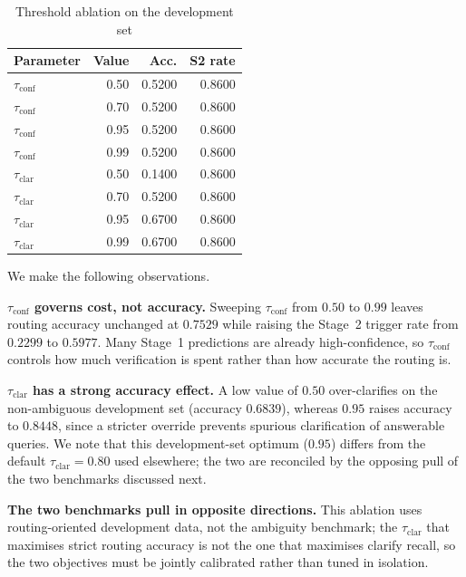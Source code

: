\begin{table}[!htbp]
\centering
\caption{Threshold ablation on the development set}\label{tab:threshold_ablation}
\begin{tabular}{lrrr}
\toprule
\textbf{Parameter} & \textbf{Value} & \textbf{Acc.} & \textbf{S2 rate} \\
\midrule
$\tau_{\mathrm{conf}}$ & 0.50 & 0.5200 & 0.8600 \\
$\tau_{\mathrm{conf}}$ & 0.70 & 0.5200 & 0.8600 \\
$\tau_{\mathrm{conf}}$ & 0.95 & 0.5200 & 0.8600 \\
$\tau_{\mathrm{conf}}$ & 0.99 & 0.5200 & 0.8600 \\
\midrule
$\tau_{\mathrm{clar}}$ & 0.50 & 0.1400 & 0.8600 \\
$\tau_{\mathrm{clar}}$ & 0.70 & 0.5200 & 0.8600 \\
$\tau_{\mathrm{clar}}$ & 0.95 & 0.6700 & 0.8600 \\
$\tau_{\mathrm{clar}}$ & 0.99 & 0.6700 & 0.8600 \\
\bottomrule
\end{tabular}
\end{table}

We make the following observations.

\noindent\textbf{$\tau_{\mathrm{conf}}$ governs cost, not accuracy.} Sweeping
$\tau_{\mathrm{conf}}$ from $0.50$ to $0.99$ leaves routing accuracy unchanged
at $0.7529$ while raising the Stage~2 trigger rate from $0.2299$ to $0.5977$.
Many Stage~1 predictions are already high-confidence, so $\tau_{\mathrm{conf}}$
controls how much verification is spent rather than how accurate the routing
is.

\noindent\textbf{$\tau_{\mathrm{clar}}$ has a strong accuracy effect.} A low
value of $0.50$ over-clarifies on the non-ambiguous development set (accuracy
$0.6839$), whereas $0.95$ raises accuracy to $0.8448$, since a stricter
override prevents spurious clarification of answerable queries. We note that
this development-set optimum ($0.95$) differs from the default
$\tau_{\mathrm{clar}}=0.80$ used elsewhere; the two are reconciled by the
opposing pull of the two benchmarks discussed next.

\noindent\textbf{The two benchmarks pull in opposite directions.} This ablation
uses routing-oriented development data, not the ambiguity benchmark; the
$\tau_{\mathrm{clar}}$ that maximises strict routing accuracy is not the one
that maximises clarify recall, so the two objectives must be jointly calibrated
rather than tuned in isolation.

